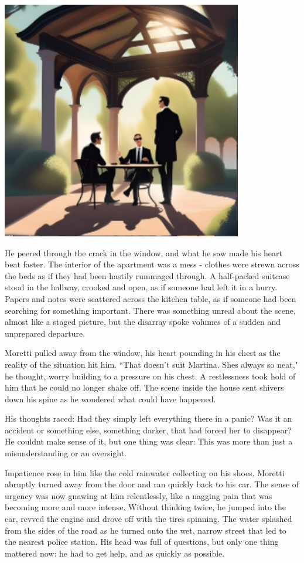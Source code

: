 \documentclass[
]{article}
\begin{document}
\includegraphics[width=4.14583in,height=4.11458in]{media/image4.png}

He peered through the crack in the window, and what he saw made his
heart beat faster. The interior of the apartment was a mess - clothes
were strewn across the beds as if they had been hastily rummaged
through. A half-packed suitcase stood in the hallway, crooked and open,
as if someone had left it in a hurry. Papers and notes were scattered
across the kitchen table, as if someone had been searching for something
important. There was something unreal about the scene, almost like a
staged picture, but the disarray spoke volumes of a sudden and
unprepared departure.

Moretti pulled away from the window, his heart pounding in his chest as
the reality of the situation hit him. ``That doesn't suit Martina.
She\textquotesingle s always so neat," he thought, worry building to a
pressure on his chest. A restlessness took hold of him that he could no
longer shake off. The scene inside the house sent shivers down his spine
as he wondered what could have happened.

His thoughts raced: Had they simply left everything there in a panic?
Was it an accident or something else, something darker, that had forced
her to disappear? He couldn\textquotesingle t make sense of it, but one
thing was clear: This was more than just a misunderstanding or an
oversight.

Impatience rose in him like the cold rainwater collecting on his shoes.
Moretti abruptly turned away from the door and ran quickly back to his
car. The sense of urgency was now gnawing at him relentlessly, like a
nagging pain that was becoming more and more intense. Without thinking
twice, he jumped into the car, revved the engine and drove off with the
tires spinning. The water splashed from the sides of the road as he
turned onto the wet, narrow street that led to the nearest police
station. His head was full of questions, but only one thing mattered
now: he had to get help, and as quickly as possible.
\end{document}
